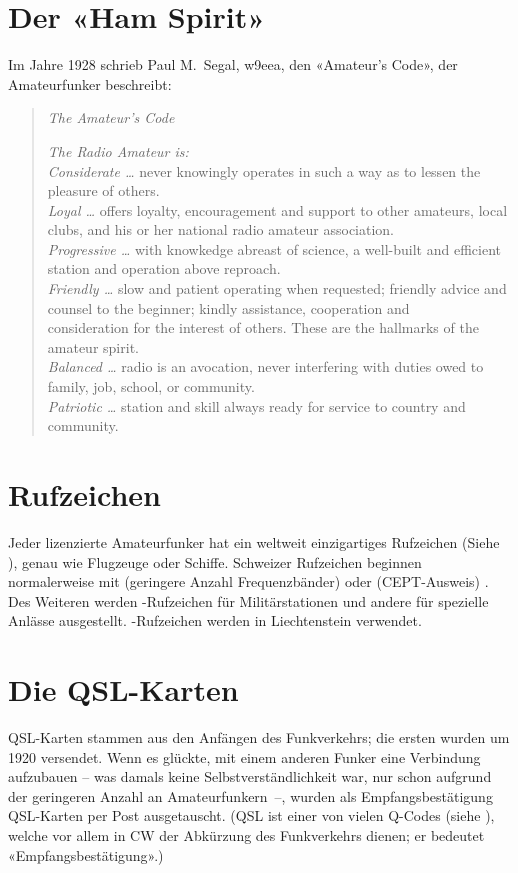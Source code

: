 \newpage
\section{Der «Ham Spirit»}
Im Jahre 1928 schrieb Paul M.~Segal, w9eea, den «Amateur's Code», der Amateurfunker beschreibt:

\begin{quotation}
\textit{The Amateur's Code}

\vspace{1em}
\noindent
\textit{The Radio Amateur is:}\\
\textit{Considerate …} never knowingly operates in such a way as to lessen the pleasure of others. \\
\textit{Loyal …} offers loyalty, encouragement and support to other amateurs, local clubs, and his or her national radio amateur association. \\
\textit{Progressive …} with knowkedge abreast of science, a well-built and efficient station and operation above reproach. \\
\textit{Friendly …} slow and patient operating when requested; friendly advice and counsel to the beginner; kindly assistance, cooperation and \\ consideration for the interest of others. These are the hallmarks of the amateur spirit. \\
\textit{Balanced …} radio is an avocation, never interfering with duties owed to family, job, school, or community. \\
\textit{Patriotic …} station and skill always ready for service to country and community.
 
\end{quotation}


\section{Rufzeichen}
Jeder lizenzierte Amateurfunker hat ein weltweit einzigartiges Rufzeichen (Siehe ), genau wie Flugzeuge oder Schiffe. Schweizer Rufzeichen beginnen normalerweise mit  (geringere Anzahl Frequenzbänder) oder (CEPT-Ausweis) . Des Weiteren werden -Rufzeichen für Militärstationen und andere für spezielle Anlässe ausgestellt. -Rufzeichen werden in Liechtenstein verwendet.

\section{Die QSL-Karten}\label{sec:qsl}
QSL-Karten stammen aus den Anfängen des Funkverkehrs; die ersten wurden um 1920 versendet. Wenn es glückte, mit einem anderen Funker eine Verbindung aufzubauen -- was damals keine Selbstverständlichkeit war, nur schon aufgrund der geringeren Anzahl an Amateurfunkern~--, wurden als Empfangsbestätigung QSL-Karten per Post ausgetauscht. (QSL ist einer von vielen Q-Codes (siehe ), welche vor allem in CW der Abkürzung des Funkverkehrs dienen; er bedeutet «Empfangsbestätigung».)

